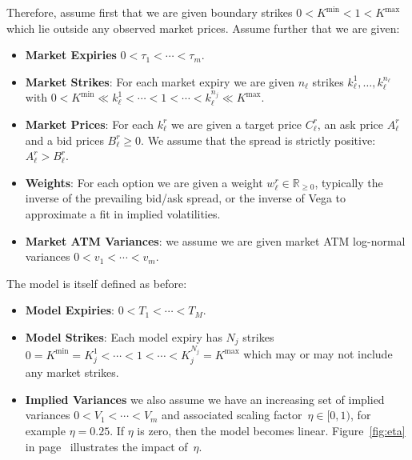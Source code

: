 \documentclass[twoside]{article}
\DeclareRobustCommand{\R}{\mathbb{R}}
\theoremstyle{plain}
\theoremstyle{definition}
\theoremstyle{remark}
\begin{document}
Therefore, assume first that we are given boundary strikes $0<K^{\min}<1<K^{\max}$ which lie
outside any observed market prices. Assume further that we are given: 

\begin{itemize}
\item 
    \textbf{Market Expiries} $0<\tau_1<\cdots<\tau_m$.
\item 
    \textbf{Market Strikes}:
    For each market expiry we are given $n_\ell$ strikes $k^1_\ell,\ldots,k^{n_\ell}_\ell$ with $0<K^{\min}\ll k_\ell^1<\cdots<1<\cdots <
    k_\ell^{n_j} \ll K^{\max}$.

\item
    \textbf{Market Prices}:
    For each $k^r_\ell$ we are given a target price $C_\ell^r$, an ask price $A_\ell^r$
    and a bid prices $B_\ell^r\geq 0$. We assume that the spread is strictly positive: $A_\ell^r>B^r_\ell$.

\item 
    \textbf{Weights}: For each option we are given a weight $w^r_\ell\in\R_{\geq 0}$,  typically the inverse of the prevailing bid/ask spread,  
    or the inverse of Vega to approximate a fit in implied volatilities.

\item
    \textbf{Market ATM Variances}: we assume we are given market ATM log-normal variances
    $0<v_1<\cdots<v_m$.
\end{itemize}

\noindent
The model is itself defined as before:
\begin{itemize}
\item 
    \textbf{Model Expiries}: $0<T_1<\cdots<T_M$.

\item  
    \textbf{Model Strikes}: Each model expiry has $N_j$ strikes $0=K^{\min}=K^1_j<\cdots<1<\cdots<K^{N_j}_j=K^{\max}$
    which may or may not include
    any market strikes.

\item  
    \textbf{Implied Variances} we also assume we have an
    increasing set of implied variances $0<V_1<\cdots<V_m$
    and associated scaling factor~$\eta\in[0,1)$, for example
    $\eta=0.25$. If $\eta$ is zero, then the model becomes linear. Figure~\ref{fig:eta}
    in page~\pageref{fig:eta} illustrates
    the impact of~$\eta$.
\end{itemize}
\end{document}
